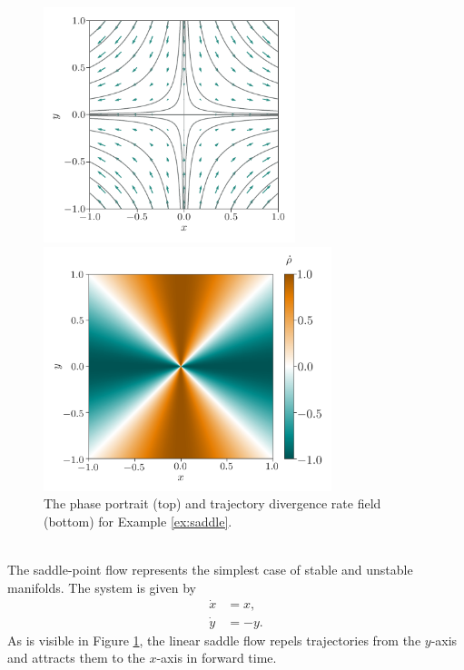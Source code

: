 \documentclass[twocolumn]{svjour3}
\begin{document}
\begin{figure}
\centering
\begin{minipage}{0.45\textwidth}
\centering
\includegraphics[height=2.7in]{Fig3}
\end{minipage}
\begin{minipage}{0.45\textwidth}
\centering
\includegraphics[height=2.8in]{Fig4}%
\end{minipage}
\caption{The phase portrait (top) and trajectory divergence rate field (bottom) for Example \ref{ex:saddle}.}
\label{fig:saddle}
\end{figure}

 \\
The saddle-point flow represents the simplest case of stable and unstable manifolds. The system is given by
\begin{equation}
\begin{aligned}
\dot{x} & = x, \\
\dot{y} & = -y.
\end{aligned}
\end{equation}
As is visible in Figure \ref{fig:saddle}, the linear saddle flow repels trajectories from the $y$-axis and attracts them to the $x$-axis in forward time.
\end{document}
